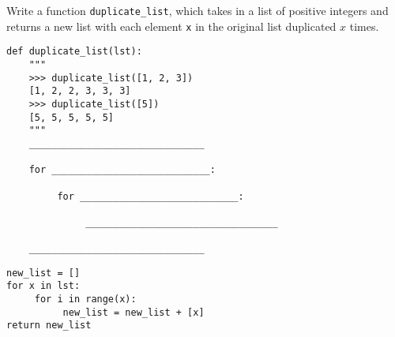\begin{blocksection}
\question Write a function \lstinline{duplicate_list}, which takes in a list of positive integers and returns a new list with each element \lstinline{x} in the original list duplicated $x$ times.

\begin{lstlisting}
def duplicate_list(lst):
    """
    >>> duplicate_list([1, 2, 3])
    [1, 2, 2, 3, 3, 3]
    >>> duplicate_list([5])
    [5, 5, 5, 5, 5]
    """
    _______________________________
    
    for ____________________________:

         for ____________________________:

              __________________________________

    _______________________________

\end{lstlisting}

\begin{solution}
\begin{lstlisting}
new_list = []
for x in lst:
     for i in range(x):
          new_list = new_list + [x]
return new_list
\end{lstlisting}
\end{solution}
\end{blocksection}

